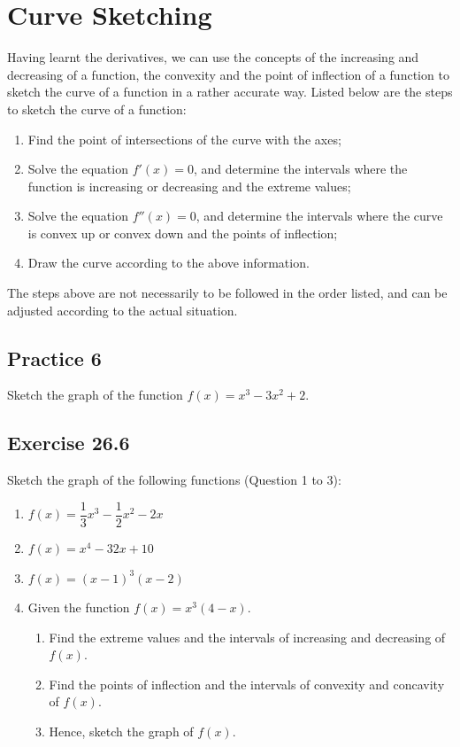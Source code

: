 \documentclass{report}
\begin{document}
\section{Curve Sketching}

Having learnt the derivatives, we can use the concepts of the increasing and
decreasing of a function, the convexity and the point of inflection of a
function to sketch the curve of a function in a rather accurate way. Listed
below are the steps to sketch the curve of a function:
\begin{enumerate}
    \item Find the point of intersections of the curve with the axes;
    \item Solve the equation $f'(x) = 0$, and determine the intervals where the function
          is increasing or decreasing and the extreme values;
    \item Solve the equation $f''(x) = 0$, and determine the intervals where the curve is
          convex up or convex down and the points of inflection;
    \item Draw the curve according to the above information.
\end{enumerate}
The steps above are not necessarily to be followed in the order listed, and can be adjusted according to the actual situation.

\subsection{Practice 6}

Sketch the graph of the function $f(x) = x^3 - 3x^2 + 2$.

\subsection{Exercise 26.6}

Sketch the graph of the following functions (Question 1 to 3):

\begin{enumerate}
    \item $f(x)=\dfrac{1}{3} x^3-\dfrac{1}{2} x^2-2 x$
    \item $f(x)=x^4-32 x+10$
    \item $f(x)=(x-1)^3(x-2)$
    \item Given the function $f(x) = x^3(4-x)$.
          \begin{enumerate}
              \item Find the extreme values and the intervals of increasing and decreasing of
                    $f(x)$.
              \item Find the points of inflection and the intervals of convexity and concavity of
                    $f(x)$.
              \item Hence, sketch the graph of $f(x)$.
          \end{enumerate}
\end{enumerate}
\end{document}
